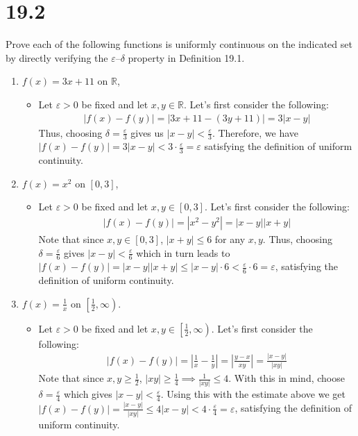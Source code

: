 \documentclass[10pt,a4paper]{article}
\theoremstyle{definition}
\begin{document}
\section*{19.2}
Prove each of the following functions is uniformly continuous on the indicated set by directly verifying the $\varepsilon$--$\delta$ property in Definition 19.1.
\begin{enumerate}[label = (\alph*)]
\item $f(x) = 3x + 11$ on $\mathbb{R}$, 
	\begin{itemize}
	\item Let $\varepsilon > 0$ be fixed and let $x,y \in \mathbb{R}$. Let's first consider the following:
	\begin{align*}
	|f(x) - f(y)| = |3x + 11 - (3y + 11)| = 3|x - y|
	\end{align*}
	Thus, choosing $\delta = \frac{\varepsilon}{3}$ gives us $|x - y| < \frac{\varepsilon}{3}$. Therefore, we have $|f(x) - f(y)| = 3|x - y| < 3 \cdot \frac{\varepsilon}{3} = \varepsilon$ satisfying the definition of uniform continuity.
	\end{itemize}
\item $f(x) = x^2$ on $[0,3]$,
	\begin{itemize}
	\item Let $\varepsilon > 0$ be fixed and let $x,y \in [0,3]$. Let's first consider the following:
	\begin{align*}
	|f(x) - f(y)| = |x^2 - y^2| = |x - y||x + y|
	\end{align*}
	Note that since $x,y \in [0,3]$, $|x + y| \leq 6$ for any $x,y$. Thus, choosing $\delta = \frac{\varepsilon}{6}$ gives $|x - y| < \frac{\varepsilon}{6}$ which in turn leads to $|f(x) - f(y)| = |x - y||x + y| \leq |x - y| \cdot 6 < \frac{\varepsilon}{6} \cdot 6 = \varepsilon$, satisfying the definition of uniform continuity.
	\end{itemize}
\item $f(x) = \frac{1}{x}$ on $\left[\frac{1}{2}, \infty\right)$.
	\begin{itemize}
	\item Let $\varepsilon > 0$ be fixed and let $x,y \in \left[\frac{1}{2}, \infty\right)$. Let's first consider the following:
	\begin{align*}
	|f(x) - f(y)| = \left|\frac{1}{x} - \frac{1}{y}\right| = \left|\frac{y - x}{xy}\right| = \frac{|x - y|}{|xy|}
	\end{align*}
	Note that since $x,y \geq \frac{1}{2}$, $|xy| \geq \frac{1}{4} \implies \frac{1}{|xy|} \leq 4$. With this in mind, choose $\delta = \frac{\varepsilon}{4}$ which gives $|x - y| < \frac{\varepsilon}{4}$. Using this with the estimate above we get $|f(x) - f(y)| = \frac{|x -y|}{|xy|} \leq 4|x - y| < 4 \cdot \frac{\varepsilon}{4} = \varepsilon$, satisfying the definition of uniform continuity.
	\end{itemize}
\end{enumerate}
\end{document}

